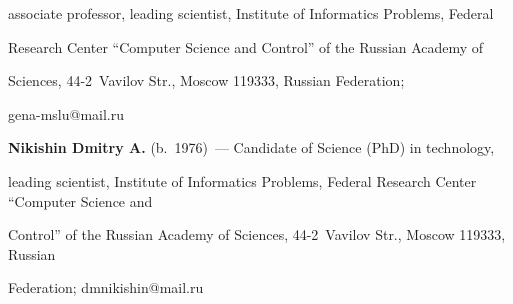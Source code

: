 associate professor, leading scientist, Institute of Informatics Problems, Federal 


Research Center ``Computer Science and Control'' of the Russian Academy of 


Sciences, 44-2~Vavilov Str., Moscow 119333, Russian Federation; 


\mbox{gena-mslu@mail.ru}





\vspace*{3pt}





\noindent


\textbf{Nikishin Dmitry A.} (b.\ 1976)~--- Candidate of Science (PhD) in technology, 


leading scientist, Institute of Informatics Problems, Federal Research Center ``Computer Science and 


Control'' of the Russian Academy of Sciences, 44-2~Vavilov Str., Moscow 119333, Russian 


Federation; \mbox{dmnikishin@mail.ru}





\label{end\stat}








\renewcommand{\bibname}{\protect\rm Литература}    


